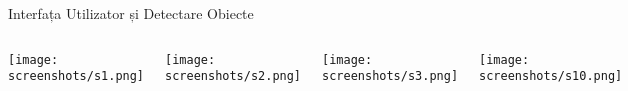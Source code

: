 \documentclass[aspectratio=169,9pt]{beamer}
\begin{document}
\begin{frame}{Interfața Utilizator și Detectare Obiecte}
        \vspace{-0.3cm}
        \begin{columns}
                        \texttt{[image: screenshots/s1.png]}
                        
                        \vspace{0.05cm}
                        
                        \texttt{[image: screenshots/s2.png]}
                        
                        \texttt{[image: screenshots/s3.png]}
                        
                        \vspace{0.05cm}
                        
                        \texttt{[image: screenshots/s10.png]}
        \end{columns}
\end{frame}
\end{document}

